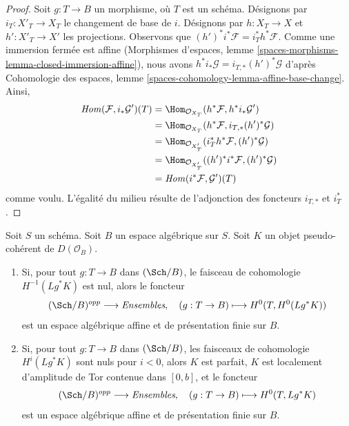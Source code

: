 \begin{proof}
Soit $g : T \to B$ un morphisme, où $T$ est un schéma. Désignons par
$i_T : X'_T \to X_T$ le changement de base de $i$. Désignons par
$h : X_T \to X$ et $h' : X'_T \to X'$ les projections. Observons que
$(h')^*i^*\mathcal{F} = i_T^*h^*\mathcal{F}$. Comme une immersion fermée est
affine (Morphismes d'espaces, lemme
\ref{spaces-morphisms-lemma-closed-immersion-affine}), nous avons
$h^*i_*\mathcal{G} = i_{T, *}(h')^*\mathcal{G}$ d'après Cohomologie des
espaces, lemme \ref{spaces-cohomology-lemma-affine-base-change}. Ainsi,
\begin{align*}
\mathit{Hom}(\mathcal{F}, i_*\mathcal{G}')(T)
& =
\Hom_{\mathcal{O}_{X_T}}(h^*\mathcal{F}, h^*i_*\mathcal{G}') \\
& =
\Hom_{\mathcal{O}_{X_T}}(h^*\mathcal{F}, i_{T, *}(h')^*\mathcal{G}) \\
& =
\Hom_{\mathcal{O}_{X'_T}}(i_T^*h^*\mathcal{F}, (h')^*\mathcal{G}) \\
& =
\Hom_{\mathcal{O}_{X'_T}}((h')^*i^*\mathcal{F}, (h')^*\mathcal{G}) \\
& =
\mathit{Hom}(i^*\mathcal{F}, \mathcal{G}')(T)
\end{align*}
comme voulu. L'égalité du milieu résulte de l'adjonction des foncteurs
$i_{T, *}$ et $i_T^*$.
\end{proof}

\begin{lemma}
\label{lemma-cohomology-perfect-complex}
Soit $S$ un schéma. Soit $B$ un espace algébrique sur $S$. Soit $K$ un objet
pseudo-cohérent de $D(\mathcal{O}_B)$.
\begin{enumerate}
\item Si, pour tout $g : T \to B$ dans $(\Sch/B)$, le faisceau de cohomologie
$H^{-1}(Lg^*K)$ est nul, alors le foncteur
$$
(\Sch/B)^{opp} \longrightarrow \textit{Ensembles},\quad
(g : T \to B) \longmapsto H^0(T, H^0(Lg^*K))
$$
est un espace algébrique affine et de présentation finie sur $B$.
\item Si, pour tout $g : T \to B$ dans $(\Sch/B)$, les faisceaux de
cohomologie $H^i(Lg^*K)$ sont nuls pour $i < 0$, alors $K$ est parfait,
$K$ est localement d'amplitude de Tor contenue dans $[0, b]$, et le foncteur
$$
(\Sch/B)^{opp} \longrightarrow \textit{Ensembles},\quad
(g : T \to B) \longmapsto H^0(T, Lg^*K)
$$
est un espace algébrique affine et de présentation finie sur $B$.
\end{enumerate}
\end{lemma}


